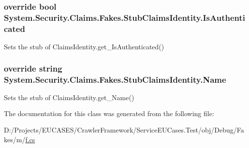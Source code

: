 \hypertarget{class_system_1_1_security_1_1_claims_1_1_fakes_1_1_stub_claims_identity_a51fbdfafd54281335dc67bbf86d16996}{
\subsubsection[{Is\-Authenticated}]{\setlength{\rightskip}{0pt plus 5cm}override bool System.\-Security.\-Claims.\-Fakes.\-Stub\-Claims\-Identity.\-Is\-Authenticated\hspace{0.3cm}{\ttfamily [get]}}}\label{class_system_1_1_security_1_1_claims_1_1_fakes_1_1_stub_claims_identity_a51fbdfafd54281335dc67bbf86d16996}


Sets the stub of Claims\-Identity.\-get\-\_\-\-Is\-Authenticated()

\hypertarget{class_system_1_1_security_1_1_claims_1_1_fakes_1_1_stub_claims_identity_ab8b14fcefbd1c3d9cd5d11e7e2f661f2}{
\subsubsection[{Name}]{\setlength{\rightskip}{0pt plus 5cm}override string System.\-Security.\-Claims.\-Fakes.\-Stub\-Claims\-Identity.\-Name\hspace{0.3cm}{\ttfamily [get]}}}\label{class_system_1_1_security_1_1_claims_1_1_fakes_1_1_stub_claims_identity_ab8b14fcefbd1c3d9cd5d11e7e2f661f2}


Sets the stub of Claims\-Identity.\-get\-\_\-\-Name()



The documentation for this class was generated from the following file\-:\begin{DoxyCompactItemize}
\item 
D\-:/\-Projects/\-E\-U\-C\-A\-S\-E\-S/\-Crawler\-Framework/\-Service\-E\-U\-Cases.\-Test/obj/\-Debug/\-Fakes/m/\hyperlink{m_2f_8cs}{f.\-cs}\end{DoxyCompactItemize}
